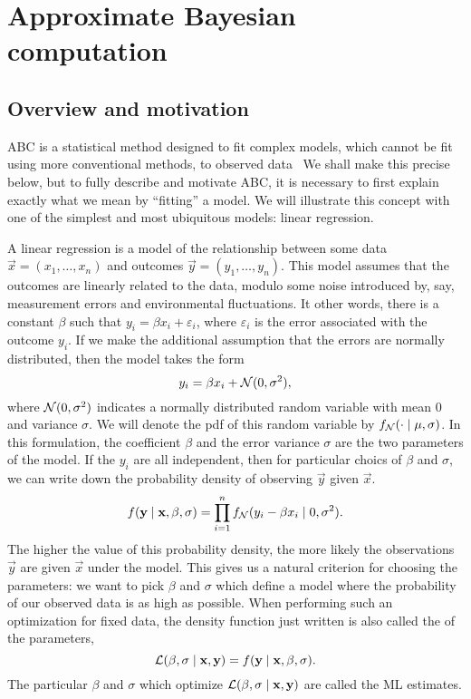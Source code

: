 \section{Approximate Bayesian computation}

\label{sec:abc}

\subsection{Overview and motivation}

\Gls{ABC} is a statistical method designed to fit complex models, which cannot
be fit using more conventional methods, to observed
data~\autocite{marin2012approximate, sunnaker2013approximate,
beaumont2010approximate} We shall make this precise below, but to fully
describe and motivate \gls{ABC}, it is necessary to first explain exactly what
we mean by ``fitting'' a model. We will illustrate this concept with one of the
simplest and most ubiquitous models: linear regression.

A linear regression is a model of the relationship between some data $\vec{x} =
(x_1, \ldots, x_n)$ and outcomes $\vec{y} = (y_1, \ldots, y_n)$. This model
assumes that the outcomes are linearly related to the data, modulo some noise
introduced by, say, measurement errors and environmental fluctuations. It other
words, there is a constant $\beta$ such that $y_i = \beta x_i + \varepsilon_i$,
where $\varepsilon_i$ is the error associated with the outcome $y_i$. If we
make the additional assumption that the errors are normally distributed, then
the model takes the form
\[
  y_i = \beta x_i + \mathcal{N}(0, \sigma^2),
\]
where $\mathcal{N}(0, \sigma^2)$ indicates a normally distributed random variable with
mean 0 and variance $\sigma$. We will denote the \gls{pdf} of this random
variable by $f_{\mathcal{N}}(\cdot \mid \mu, \sigma)$. In this formulation, the
coefficient $\beta$ and the error variance $\sigma$ are the two parameters of
the model. If the $y_i$ are all independent, then for particular choics of
$\beta$ and $\sigma$, we can write down the probability density of observing
$\vec{y}$ given $\vec{x}$.
\[
  f(\mathbf{y} \mid \mathbf{x}, \beta, \sigma) = 
  \prod_{i=1}^n f_{\mathcal{N}}(y_i - \beta x_i \mid 0, \sigma^2).
\]
The higher the value of this probability density, the more likely the
observations $\vec{y}$ are given $\vec{x}$ under the model. This gives us a
natural criterion for choosing the parameters: we want to pick $\beta$ and
$\sigma$ which define a model where the probability of our observed data is as
high as possible. When performing such an optimization for fixed data, the
density function just written is also called the  of the
parameters,
\[
  \mathcal{L}(\beta, \sigma \mid \mathbf{x}, \mathbf{y}) = f(\mathbf{y} \mid \mathbf{x}, \beta, \sigma).
\]
The particular $\beta$ and $\sigma$ which optimize $\mathcal{L}(\beta, \sigma \mid
\mathbf{x}, \mathbf{y})$ are called the \gls{ML} estimates. 

